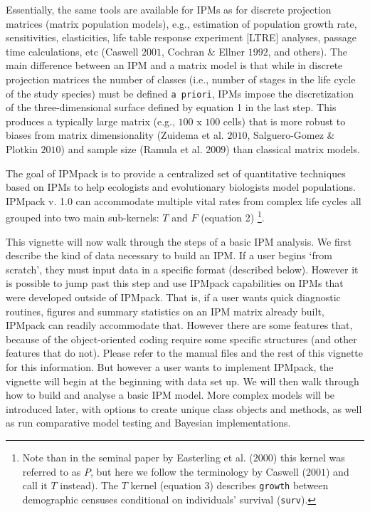 \documentclass{article}
\begin{document}
Essentially, the same tools are available for IPMs as for discrete projection matrices (matrix population models), e.g., estimation of population growth rate, sensitivities, elasticities, life table response experiment [LTRE] analyses, passage time calculations, etc (Caswell $2001$, Cochran \& Ellner $1992$, and others). The main difference between an IPM and a matrix model is that while in discrete projection matrices the number of classes (i.e., number of stages in the life cycle of the study species) must be defined {\tt a priori}, IPMs impose the discretization of the three-dimensional surface defined by equation 1 in the last step. This produces a typically large matrix (e.g., $100$ x $100$ cells) that is more robust to biases from matrix dimensionality (Zuidema et al. $2010$, Salguero-Gomez \& Plotkin $2010$) and sample size (Ramula et al. $2009$) than classical matrix models.  

The goal of IPMpack is to provide a centralized set of quantitative techniques based on IPMs to help ecologists and evolutionary biologists model populations. IPMpack v. 1.0 can accommodate multiple vital rates from complex life cycles all grouped into two main sub-kernels: $T$ and $F$ (equation 2) \footnote{Note than in the seminal paper by Easterling et al. ($2000$) this kernel was referred to as $P$, but here we follow the terminology by Caswell ($2001$) and call it $T$ instead). The $T$ kernel (equation 3) describes {\tt growth} between demographic censuses conditional on individuals' survival ({\tt surv}).
}.

This vignette will now walk through the steps of a basic IPM analysis.  We first describe the kind of data necessary to build an IPM.  If a user begins `from scratch', they must input data in a specific format (described below).  However it is possible to jump past this step and use IPMpack capabilities on IPMs that were developed outside of IPMpack.  That is, if a user wants quick diagnostic routines, figures and summary statistics on an IPM matrix already built, IPMpack can readily accommodate that.   However there are some features that, because of the object-oriented coding require some specific structures (and other features that do not).  Please refer to the manual files and the rest of this vignette for this information.  But however a user wants to implement IPMpack, the vignette will begin at the beginning with data set up.  We will then walk through how to build and analyse a basic IPM model.  More complex models will be introduced later, with options to create unique class objects and methods, as well as run comparative model testing and Bayesian implementations.
\end{document}
